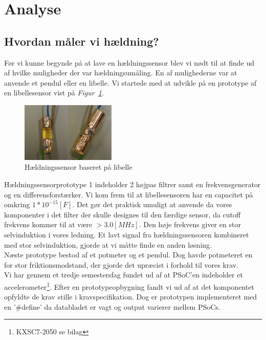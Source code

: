 \section{Analyse}
\subsection{Hvordan måler vi hældning?}
Før vi kunne begynde på at lave en hældningssensor blev vi nødt til at finde ud af hvilke muligheder der var hældningsumåling. En af mulighederne var at anvende et pendul eller en libelle. Vi startede med at udvikle på en prototype af en libellesensor vist på \textit{Figur~\ref{fig:libelle}}.
\begin{figure}[hbpt]
\centering
\includegraphics[width=0.4\textwidth]{billeder/libellesensor1}
\caption{Hældningssensor baseret på libelle}
\label{fig:libelle}
\end{figure}
Hældningssensorprototype 1 indeholder 2 højpas filtrer samt en frekvensgenerator og en differensforstærker. Vi kom frem til at libellesensoren har en capacitet på omkring $1*10^{-15}[F]$. Det gør det praktisk umuligt at anvende da vores komponenter i det filter der skulle designes til den færdige sensor, da cutoff frekvens kommer til at være $>3.0[MHz]$. Den høje frekvens giver en stor selvinduktion i vores ledning. Et lavt signal fra hældningssensoren kombineret med stor selvinduktion, gjorde at vi måtte finde en anden løsning.\\
Næste prototype bestod af et potmeter og et pendul. Dog havde potmeteret en for stor friktionsmodstand, der gjorde det upræcist i forhold til vores krav.\\
Vi har gennem et tredje semestersfag fundet ud af at PSoC'en indeholder et accelerometer\footnote{KXSC7-2050 se bilag}. Efter en prototypeopbygning fandt vi ud af at det komponentet opfyldte de krav stille i kravspecifikation. Dog er prototypen implementeret med en '\#define' da databladet er vagt og output varierer mellem PSoCs.
